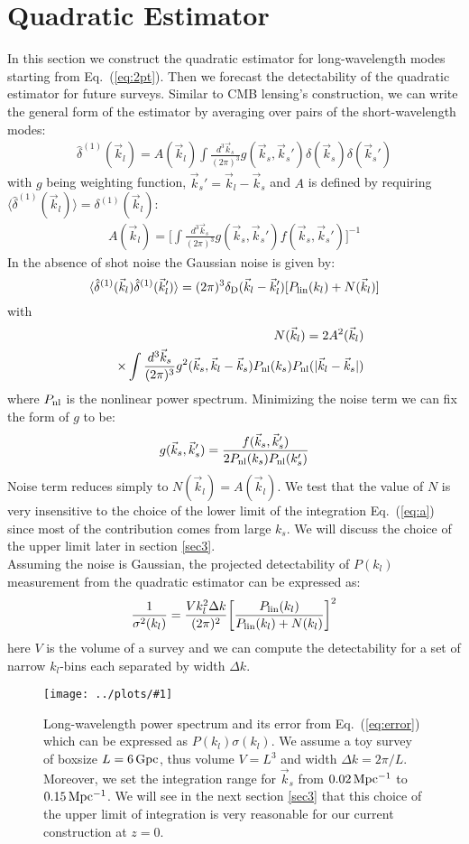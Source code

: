 \documentclass[prd,amsmath,amssymb,floatfix,superscriptaddress,nofootinbib,twocolumn]{revtex4-1}
\def\be{\begin{equation}}
\def\ee{\end{equation}}
\newcommand{\vs}{\nonumber\\}
\newcommand{\vk}{\vec{k}}
\newcommand{\ec}[1]{Eq.~(\ref{eq:#1})}
\newcommand{\eql}[1]{\label{eq:#1}}
\newcommand{\sfig}[2]{
\texttt{[image: ../plots/\#1]}
        }
\newcommand{\Sfig}[2]{
   \begin{figure}[thbp]
   \begin{center}
    \sfig{../plots/#1.pdf}{\columnwidth}
    \caption{{\small #2}}
    \label{fig:#1}
     \end{center}
   \end{figure}
}
\begin{document}
\section{Quadratic Estimator}\label{sec2}
In this section we construct the quadratic estimator for long-wavelength modes starting from \ec{2pt}. Then we forecast the detectability of the quadratic estimator for future surveys. Similar to CMB lensing's construction, we can write the general form of the estimator by averaging over pairs of the short-wavelength modes:
\begin{eqnarray}
\hat{\delta}^{(1)}(\vec{k}_l)=A(\vec{k}_l)\int \frac{d^3 \vec{k}_s}{(2\pi)^3} g(\vec{k}_s,\vec{k}_s'){\delta}(\vec{k}_s){\delta}(\vec{k}_s') \eql{quadest}
\end{eqnarray} 
with $g$ being weighting function, $\vk_s'=\vk_l-\vk_s$ and $A$ is defined by requiring $\langle \hat{\delta}^{(1)}(\vec{k}_l) \rangle={\delta}^{(1)}(\vec{k}_l)$:
\begin{eqnarray}
A(\vec{k}_l)=\bigg[\int \frac{d^3 \vec{k}_s}{(2\pi)^3} g(\vec{k}_s,\vec{k}_s')f(\vec{k}_s,\vec{k}_s')  \bigg]^{-1} \eql{a}
\end{eqnarray}
In the absence of shot noise the Gaussian noise is given by:
\be 
\langle \hat{\delta}^{(1)}(\vk_{l})\hat{\delta}^{(1)}(\vk_{l}') \rangle = (2\pi)^3 \delta_{\rm D}(\vk_{l}-\vk_{l}')[P_{\rm lin}(k_{l})+N(\vk_l)]
\ee 
with 
\begin{eqnarray}
&&N(\vec{k}_{l})=2A^2(\vk_{l})\vs
&&\times\int \frac{d^3 \vec{k}_{s}}{(2\pi)^3} g^2(\vec{k}_{s},\vk_l-\vec{k}_{s})P_{\rm nl}(k_{s})P_{\rm nl}(|\vk_l-\vk_s|)
\end{eqnarray}
where $P_{\rm nl}$ is the nonlinear power spectrum. Minimizing the noise term we can fix the form of $g$ to be:
\begin{eqnarray}
g(\vec{k}_{s},\vec{k}_{s}')=\frac{f(\vec{k}_{s},\vec{k}_{s}')}{2P_{\rm nl}(k_{s})P_{\rm nl}(k_{s}')}
\end{eqnarray} 
Noise term reduces simply to $N(\vk_l)=A(\vk_l)$. We test that the value of $N$ is very insensitive to the choice of the lower limit of the integration \ec{a} since most of the contribution comes from large $k_s$. We will discuss the choice of the upper limit later in section \ref{sec3}.\\
Assuming the noise is Gaussian, the projected detectability of $P(k_l)$ measurement from the quadratic estimator can be expressed as:
\be
\frac{1}{\sigma^{2}(k_l)}=\frac{V k_l^2 \Delta k }{(2\pi)^2}\bigg[\frac{P_{\rm lin}(k_l)}{P_{\rm lin}(k_l)+N(k_l) }\bigg]^2 \eql{error}
\ee
here $V$ is the volume of a survey and we can compute the detectability for a set of narrow $k_l$-bins each separated by width $\Delta k$.
\Sfig{SN}{Long-wavelength power spectrum and its error from \ec{error} which can be expressed as $P(k_l)\sigma(k_l)$. We assume a toy survey of boxsize $L=6\, \rm Gpc$, thus volume $V=L^3$ and width $\Delta k = 2\pi/L$. Moreover, we set the integration range for $\vk_s$ from $0.02 \, \rm Mpc^{-1}$ to $0.15\,\rm Mpc^{-1}$. We will see in the next section \ref{sec3} that this choice of the upper limit of integration is very reasonable for our current construction at $z=0$.}
\end{document}

